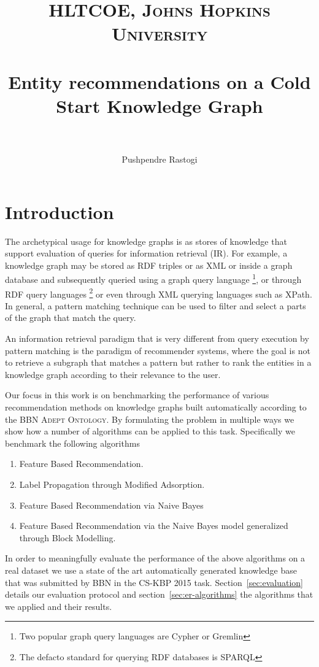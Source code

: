 \documentclass[paper=a4,fontsize=11pt]{scrartcl}
\title{
  \usefont{OT1}{bch}{b}{n}
  \normalfont\normalsize\textsc{HLTCOE, Johns Hopkins University}\\[25pt]
  \horrule{0.5pt}\\[0.4cm]
  \huge Entity recommendations on a Cold Start Knowledge Graph\\
  \horrule{2pt}\\[0.5cm]
}
\author{
  \normalfont\normalsize
  Pushpendre Rastogi\\
}
\date{}
\newcommand{\secref}[1]{section~\ref{#1}}
\newcommand{\Secref}[1]{Section~\ref{#1}}
\numberwithin{equation}{section}    %
\numberwithin{figure}{section}      %
\numberwithin{table}{section}       %
\newcommand{\ontology}{\textsc{BBN Adept Ontology}}
\newcommand{\task}{CS-KBP 2015 task}
\begin{document}
\maketitle
\section{Introduction}
\label{sec:introduction}
The archetypical usage for knowledge graphs is as stores of knowledge that
support evaluation of queries for information retrieval (IR). For example, a
knowledge graph may be stored as RDF triples or as XML or inside a graph database
and subsequently queried using a graph query language
\footnote{Two popular graph query languages are Cypher or Gremlin},
or through RDF query languages
\footnote{The defacto standard for querying RDF databases is SPARQL}
or even through XML querying languages such as XPath.
In general, a pattern matching technique can be used to filter and select
a parts of the graph that match the query.

An information retrieval paradigm that is very different from query execution by
pattern matching
is the paradigm of recommender systems, where the goal is not to retrieve a
subgraph that matches a pattern but rather to rank the entities in a knowledge graph
according to their relevance to the user.

Our focus in this work is on benchmarking the performance of various recommendation
methods on knowledge graphs built automatically according to the \ontology.
By formulating the problem in multiple ways
we show how a number of algorithms can be applied to this task.
Specifically we benchmark the following algorithms
\begin{snugshade}
\begin{enumerate}
\item Feature Based Recommendation.
\item Label Propagation through Modified Adsorption.
\item Feature Based Recommendation via Naive Bayes
\item Feature Based Recommendation via the Naive Bayes model
  generalized through Block Modelling.
\end{enumerate}
\end{snugshade}

In order to meaningfully evaluate the performance of the above algorithms on a real dataset
we use a state of the art automatically generated knowledge base that was submitted by BBN in
the \task. \Secref{sec:evaluation} details our evaluation protocol and
 \secref{sec:er-algorithms} the algorithms that we applied and
their results.
\end{document}
